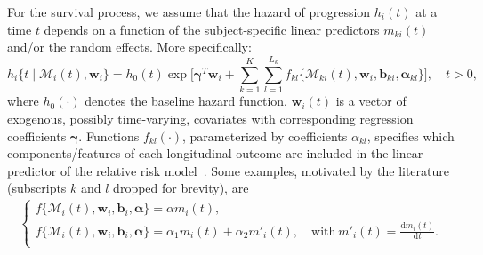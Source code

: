 For the survival process, we assume that the hazard of progression $h_i(t)$ at a time $t$ depends on a function of the subject-specific linear predictors $m_{ki}(t)$ and/or the random effects. More specifically:
\begin{equation}
\label{eq:rel_risk_model}
h_i\big\{t \mid \mathcal{M}_i(t), \boldsymbol{w}_i\big\} = h_0(t) \exp\Big[\boldsymbol{\gamma}^T\boldsymbol{w}_i + \sum_{k=1}^{K} \sum_{l=1}^{L_k} f_{kl} \big\{ \mathcal{M}_{ki}(t), \boldsymbol{w}_i, \boldsymbol{b}_{ki}, \boldsymbol{\alpha}_{kl} \big\}\Big], \quad t>0,
\end{equation}
where $h_0(\cdot)$ denotes the baseline hazard function, $\boldsymbol{w}_i(t)$ is a vector of exogenous, possibly time-varying, covariates with corresponding regression coefficients $\boldsymbol{\gamma}$. Functions $f_{kl}(\cdot)$, parameterized by coefficients $\alpha_{kl}$, specifies which components/features of each longitudinal outcome are included in the linear predictor of the relative risk model~\citep{brown2009assessing,rizopoulos2012joint,taylor2013real}. Some examples, motivated by the literature (subscripts $k$ and $l$ dropped for brevity), are
\begin{eqnarray*}
\left \{
\begin{array}{l}
f\big\{\mathcal{M}_{i}(t), \boldsymbol{w}_i, \boldsymbol{b}_{i}, \boldsymbol{\alpha} \big\} = \alpha m_{i}(t),\\
f\big\{ \mathcal{M}_{i}(t), \boldsymbol{w}_i, \boldsymbol{b}_{i}, \boldsymbol{\alpha}\big\} = \alpha_1 m_{i}(t) + \alpha_2 m'_{i}(t),\quad \text{with}\  m'_{i}(t) = \frac{\mathrm{d}{m_{i}(t)}}{\mathrm{d}{t}}.\\
\end{array}
\right.
\end{eqnarray*}
